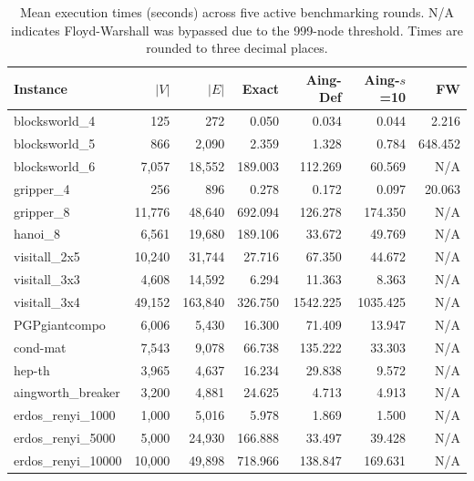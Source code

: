 \begin{table}[htbp]
\centering
\caption{Mean execution times (seconds) across five active benchmarking rounds. N/A indicates Floyd-Warshall was bypassed due to the 999-node threshold. Times are rounded to three decimal places.}
\label{tab:mean_times}
\begin{tabular}{lrrrrrr}
\hline
\textbf{Instance} & $|V|$ & $|E|$ & \textbf{Exact} & \textbf{Aing-Def} & \textbf{Aing-$s$=10} & \textbf{FW} \\
\hline
blocksworld\_4     & 125    & 272     & 0.050   & 0.034   & 0.044   & 2.216   \\
blocksworld\_5     & 866    & 2,090   & 2.359   & 1.328   & 0.784   & 648.452 \\
blocksworld\_6     & 7,057  & 18,552  & 189.003 & 112.269 & 60.569  & N/A     \\
gripper\_4         & 256    & 896     & 0.278   & 0.172   & 0.097   & 20.063  \\
gripper\_8         & 11,776 & 48,640  & 692.094 & 126.278 & 174.350 & N/A     \\
hanoi\_8           & 6,561  & 19,680  & 189.106 & 33.672  & 49.769  & N/A     \\
visitall\_2x5      & 10,240 & 31,744  & 27.716  & 67.350  & 44.672  & N/A     \\
visitall\_3x3      & 4,608  & 14,592  & 6.294   & 11.363  & 8.363   & N/A     \\
visitall\_3x4      & 49,152 & 163,840 & 326.750 & 1542.225 & 1035.425 & N/A   \\
PGPgiantcompo      & 6,006  & 5,430   & 16.300  & 71.409  & 13.947  & N/A     \\
cond-mat           & 7,543  & 9,078   & 66.738  & 135.222 & 33.303  & N/A     \\
hep-th             & 3,965  & 4,637   & 16.234  & 29.838  & 9.572   & N/A     \\
aingworth\_breaker & 3,200  & 4,881   & 24.625  & 4.713   & 4.913   & N/A     \\
erdos\_renyi\_1000  & 1,000  & 5,016   & 5.978   & 1.869   & 1.500   & N/A     \\
erdos\_renyi\_5000  & 5,000  & 24,930  & 166.888 & 33.497  & 39.428  & N/A     \\
erdos\_renyi\_10000 & 10,000 & 49,898  & 718.966 & 138.847 & 169.631 & N/A     \\
\hline
\end{tabular}
\end{table}


